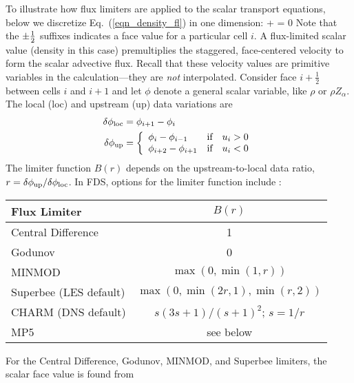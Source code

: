 To illustrate how flux limiters are applied to the scalar transport equations, below we discretize Eq.~(\ref{eqn_density_fl}) in one dimension:
\be  {}
    +  = 0
\ee
Note that the $\pm\frac{1}{2}$ suffixes indicates a face value for a particular cell $i$. A flux-limited scalar value (density in this case) premultiplies the staggered, face-centered velocity to form the scalar advective flux.  Recall that these velocity values are primitive variables in the calculation---they are \emph{not} interpolated.
Consider face $i+\frac{1}{2}$ between cells $i$ and $i+1$ and let $\phi$ denote a general scalar variable, like $\rho$ or $\rho Z_\alpha$.  The local (loc) and upstream (up) data variations are
\begin{align}
\delta \phi_{\rm loc} &= \phi_{i+1}-\phi_i \\
\delta \phi_{\rm up}  &= \left\{ \begin{array}{ll} \phi_i-\phi_{i-1} & \mbox{if} \quad u_i>0 \\ \phi_{i+2}-\phi_{i+1} & \mbox{if} \quad u_i<0 \end{array} \right.
\end{align}
The limiter function $B(r)$ depends on the upstream-to-local data ratio, $r=\delta \phi_{\rm up}/\delta \phi_{\rm loc}$. In FDS, options for the limiter function include \cite{Toro}:
\begin{table}[H]
\begin{center}
\begin{tabular}{lc}
Flux Limiter                           & $B(r)$                         \\
\hline
Central Difference                     & 1                              \\
Godunov                                & 0                              \\
MINMOD                                 & $\max(0,\min(1,r))$            \\
Superbee \cite{Roe:1986} (LES default) & $\max(0,\min(2r,1),\min(r,2))$ \\
CHARM \cite{Zhou:1995} (DNS default)   & $s(3s+1)/(s+1)^2$; $s=1/r$     \\
MP5 \cite{Suresh:1997}                 & see below
\end{tabular}
\end{center}
\end{table}
\noindent For the Central Difference, Godunov, MINMOD, and Superbee limiters, the scalar face value is found from
